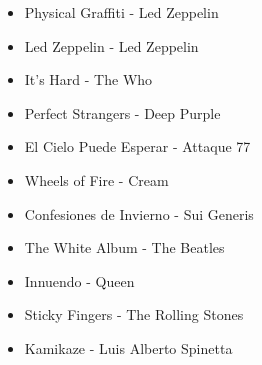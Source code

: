 \begin{itemize}
  \item Physical Graffiti - Led Zeppelin
  \item Led Zeppelin - Led Zeppelin
  \item It's Hard - The Who
  \item Perfect Strangers - Deep Purple
  \item El Cielo Puede Esperar - Attaque 77
  \item Wheels of Fire - Cream
  \item Confesiones de Invierno - Sui Generis
  \item The White Album - The Beatles
  \item Innuendo - Queen
  \item Sticky Fingers - The Rolling Stones
  \item Kamikaze - Luis Alberto Spinetta
\end{itemize}

